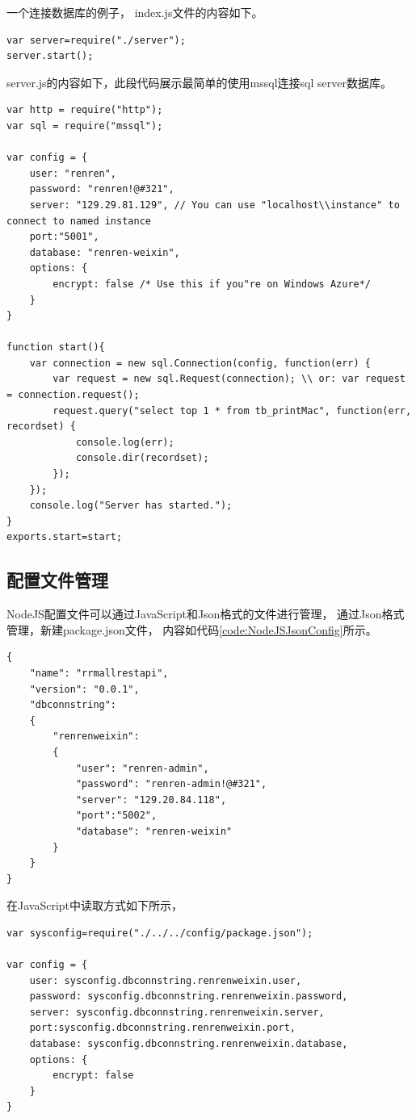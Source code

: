 \documentclass{book}
\begin{document}
一个连接数据库的例子，
index.js文件的内容如下。

\begin{lstlisting}[language=VBScript]
var server=require("./server");
server.start();
\end{lstlisting}

server.js的内容如下，此段代码展示最简单的使用mssql连接sql server数据库。

\begin{lstlisting}[language=VBScript]
var http = require("http");
var sql = require("mssql");

var config = {
    user: "renren",
    password: "renren!@#321",
    server: "129.29.81.129", // You can use "localhost\\instance" to connect to named instance
    port:"5001",
    database: "renren-weixin",
    options: {
        encrypt: false /* Use this if you"re on Windows Azure*/
    }
}

function start(){
    var connection = new sql.Connection(config, function(err) {
        var request = new sql.Request(connection); \\ or: var request = connection.request();
        request.query("select top 1 * from tb_printMac", function(err, recordset) {           
            console.log(err);
            console.dir(recordset);
        });
    });
    console.log("Server has started.");
}
exports.start=start;
\end{lstlisting}

\subsection{配置文件管理}

NodeJS配置文件可以通过JavaScript和Json格式的文件进行管理，
通过Json格式管理，新建package.json文件，
内容如代码\ref{code:NodeJSJsonConfig}所示。

\begin{lstlisting}[language={[Sharp]C},caption=NodeJS json格式配置,label={code:NodeJSJsonConfig}]
{
    "name": "rrmallrestapi",
    "version": "0.0.1",
    "dbconnstring":
    {
        "renrenweixin":
        {
            "user": "renren-admin",
            "password": "renren-admin!@#321",
            "server": "129.20.84.118",
            "port":"5002",
            "database": "renren-weixin"
        }        
    }
}
\end{lstlisting}

在JavaScript中读取方式如下所示，

\begin{lstlisting}[language=VBScript]
var sysconfig=require("./../../config/package.json");

var config = {
    user: sysconfig.dbconnstring.renrenweixin.user,
    password: sysconfig.dbconnstring.renrenweixin.password,
    server: sysconfig.dbconnstring.renrenweixin.server, 
    port:sysconfig.dbconnstring.renrenweixin.port,
    database: sysconfig.dbconnstring.renrenweixin.database,
    options: {
        encrypt: false
    }
}
\end{lstlisting}
\end{document}
